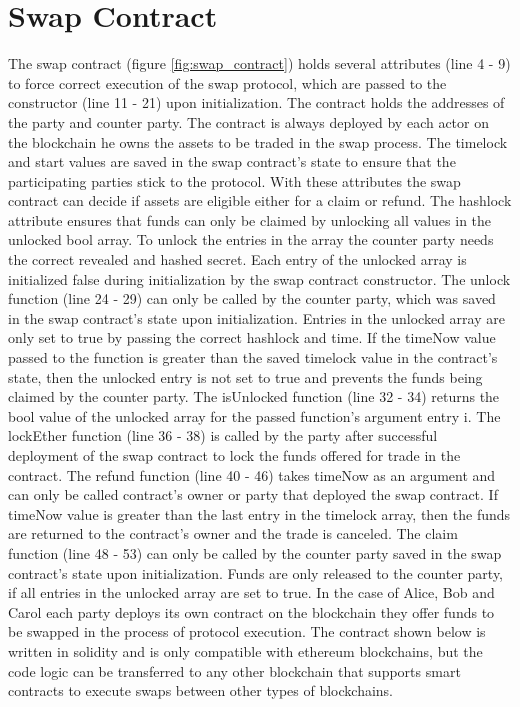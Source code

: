 %
%
\section{Swap Contract}
\label{sec:chapter04:smartcontracts}

The swap contract (figure \ref{fig:swap_contract}) holds several attributes (line 4 - 9) to force correct execution of the swap protocol, which are passed to the constructor (line 11 - 21) upon initialization. The contract holds the addresses of the party and counter party. The contract is always deployed by each actor on the blockchain he owns the assets to be traded in the swap process. The timelock and start values are saved in the swap contract's state to ensure that the participating parties stick to the protocol. With these attributes the swap contract can decide if assets are eligible either for a claim or refund. The hashlock attribute ensures that funds can only be claimed by unlocking all values in the unlocked bool array. To unlock the entries in the array the counter party needs the correct revealed and hashed secret. Each entry of the unlocked array is initialized false during initialization by the swap contract constructor. The unlock function (line 24 - 29) can only be called by the counter party, which was saved in the swap contract's state upon initialization. Entries in the unlocked array are only set to true by passing the correct hashlock and time. If the timeNow value passed to the function is greater than the saved timelock value in the contract's state, then the unlocked entry is not set to true and prevents the funds being claimed by the counter party. The isUnlocked function (line 32 - 34) returns the bool value of the unlocked array for the passed function's argument entry i. The lockEther function (line 36 - 38) is called by the party after successful deployment of the swap contract to lock the funds offered for trade in the contract. The refund function (line 40 - 46) takes timeNow as an argument and can only be called contract's owner or party that deployed the swap contract. If timeNow value is greater than the last entry in the timelock array, then the funds are returned to the contract's owner and the trade is canceled. The claim function (line 48 - 53) can only be called by the counter party saved in the swap contract's state upon initialization. Funds are only released to the counter party, if all entries in the unlocked array are set to true. In the case of Alice, Bob and Carol each party deploys its own contract on the blockchain they offer funds to be swapped in the process of protocol execution. The contract shown below is written in solidity and is only compatible with ethereum blockchains, but the code logic can be transferred to any other blockchain that supports smart contracts to execute swaps between other types of blockchains.


